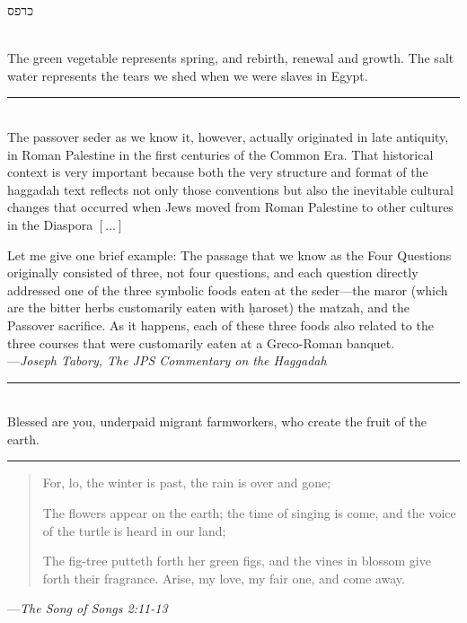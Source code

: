 \documentclass[letter,11pt,openany]{memoir}
\newcommand{\HgInst}[1]{{\noindent\sffamily{\bfseries{#1}}}}
\newcommand{\HgEllipsis}{\ensuremath{\left[\ldots\right]}}
\newcommand{\HgSource}[1]{\hfill{\small---\itshape{#1}}}
\newcommand{\hchapter}[1]{
  \begin{hebrew}
    \begin{Spacing}{.97}
      \newpage
      \strut

      \vspace{.15em}

      \begin{flushleft}
      \noindent\Huge #1
      \end{flushleft}

      \vspace{1em}
    \end{Spacing}
  \end{hebrew}
}
\newcommand{\HgFill}{\vfill \hrule \vfill}
\newenvironment{HgEnglish}{\strut\\\noindent}{\vspace{1em}}
\newcommand{\JSrc}{\textsuperscript{\upshape{[J]}}}
\newcommand{\SSrc}{\textsuperscript{\upshape{[S]}}}
\begin{document}
\HgInst{Eat the parsley.}

\vfill

\hchapter{כרפס}

\begin{HgEnglish}
The green vegetable represents spring, and rebirth, renewal and growth. The salt
water represents the tears we shed when we were slaves in Egypt.
\end{HgEnglish}

\HgFill

\begin{HgEnglish}
  The passover seder as we know it, however, actually originated in late
  antiquity, in Roman Palestine in the first centuries of the Common Era. That
  historical context is very important because both the very structure and
  format of the haggadah text reflects not only those conventions but also the
  inevitable cultural changes that occurred when Jews moved from Roman Palestine
  to other cultures in the Diaspora \HgEllipsis

  Let me give one brief example: The passage that we know as the
  Four Questions originally consisted of three, not four questions, and each
  question directly addressed one of the three symbolic foods eaten at the
  seder---the maror (which are the bitter herbs customarily eaten with
  \d{h}aroset) the matzah, and the Passover sacrifice. As it happens, each of
  these three foods also related to the three courses that were customarily
  eaten at a Greco-Roman banquet. \\

  \HgSource{Joseph Tabory, The JPS Commentary on the Haggadah}
\end{HgEnglish}

\HgFill

\begin{HgEnglish}
  Blessed are you, underpaid migrant farmworkers, who create the fruit of the
  earth.\SSrc
\end{HgEnglish}

\HgFill

\begin{verse}
  For, lo, the winter is past, the rain is over and gone;

  The flowers appear on the earth; the time of singing is come, and the voice of
  the turtle is heard in our land;

  The fig-tree putteth forth her green figs, and the vines in blossom give forth
  their fragrance. Arise, my love, my fair one, and come away.
\end{verse}
\HgSource{The Song of Songs 2:11-13 \JSrc}
\end{document}
